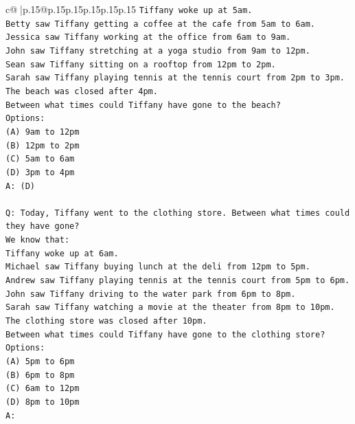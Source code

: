 \documentclass{article}
\begin{document}
{\begin{supertabular}{c@{$\;$}|p{.15\linewidth}@{}p{.15\linewidth}p{.15\linewidth}p{.15\linewidth}p{.15\linewidth}p{.15\linewidth}}
{{{\texttt{Tiffany woke up at 5am.} \\
\texttt{Betty saw Tiffany getting a coffee at the cafe from 5am to 6am.} \\
\texttt{Jessica saw Tiffany working at the office from 6am to 9am.} \\
\texttt{John saw Tiffany stretching at a yoga studio from 9am to 12pm.} \\
\texttt{Sean saw Tiffany sitting on a rooftop from 12pm to 2pm.} \\
\texttt{Sarah saw Tiffany playing tennis at the tennis court from 2pm to 3pm.} \\
\texttt{The beach was closed after 4pm.} \\
\texttt{Between what times could Tiffany have gone to the beach?} \\
\texttt{Options:} \\
\texttt{(A) 9am to 12pm} \\
\texttt{(B) 12pm to 2pm} \\
\texttt{(C) 5am to 6am} \\
\texttt{(D) 3pm to 4pm} \\
\texttt{A: (D)} \\
\\ 
\texttt{Q: Today, Tiffany went to the clothing store. Between what times could they have gone?} \\
\texttt{We know that:} \\
\texttt{Tiffany woke up at 6am.} \\
\texttt{Michael saw Tiffany buying lunch at the deli from 12pm to 5pm.} \\
\texttt{Andrew saw Tiffany playing tennis at the tennis court from 5pm to 6pm.} \\
\texttt{John saw Tiffany driving to the water park from 6pm to 8pm.} \\
\texttt{Sarah saw Tiffany watching a movie at the theater from 8pm to 10pm.} \\
\texttt{The clothing store was closed after 10pm.} \\
\texttt{Between what times could Tiffany have gone to the clothing store?} \\
\texttt{Options:} \\
\texttt{(A) 5pm to 6pm} \\
\texttt{(B) 6pm to 8pm} \\
\texttt{(C) 6am to 12pm} \\
\texttt{(D) 8pm to 10pm} \\
\texttt{A:} \\
            }
        }
    }
     \\ \\


\end{supertabular}}
\end{document}
